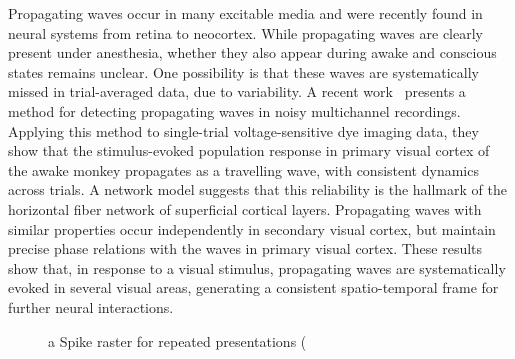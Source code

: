 \documentclass[brainsci, %
               review,submit,pdftex,moreauthors%
               ]{Definitions/mdpi}
\begin{document}
Propagating waves occur in many excitable media and were recently found in neural systems from retina to neocortex. While propagating waves are clearly present under anesthesia, whether they also appear during awake and conscious states remains unclear. One possibility is that these waves are systematically missed in trial-averaged data, due to variability. A recent work~\citep{muller_stimulus-evoked_2014} presents a method for detecting propagating waves in noisy multichannel recordings. Applying this method to single-trial voltage-sensitive dye imaging data, they show that the stimulus-evoked population response in primary visual cortex of the awake monkey propagates as a travelling wave, with consistent dynamics across trials. A network model suggests that this reliability is the hallmark of the horizontal fiber network of superficial cortical layers. Propagating waves with similar properties occur independently in secondary visual cortex, but maintain precise phase relations with the waves in primary visual cortex. These results show that, in response to a visual stimulus, propagating waves are systematically evoked in several visual areas, generating a consistent spatio-temporal frame for further neural interactions.

\begin{figure}
\centering
\caption{a Spike raster for repeated presentations (%
}\label{fig:davis}
\end{figure}
\end{document}

